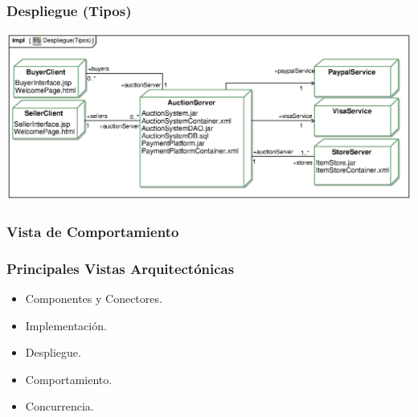 ﻿\documentclass[handout,a4paper,slidestop,xcolor=pst,blue]{beamer}
\begin{document}
\begin{frame}[c]
	\frametitle{Despliegue (Tipos)}
	\begin{center}
		\includegraphics[width=\linewidth]{images/architecturalViews/despliegue(tipos).eps}
	\end{center}
\end{frame}


\subsubsection{Vista de Comportamiento}

\begin{frame}[c]
	\frametitle{Principales Vistas Arquitectónicas}
	\begin{itemize}
		\item Componentes y Conectores.
        \item Implementación.
		\item Despliegue.
		\item \alert{Comportamiento}.
		\item Concurrencia.
	\end{itemize}
\end{frame}

%
\end{document}
